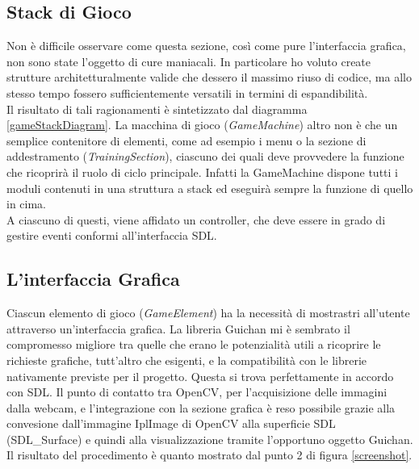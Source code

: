 \documentclass[a4paper,10pt, twocolumn]{article}
\begin{document}
  \subsection{Stack di Gioco}
  Non \`{e} difficile osservare come questa sezione, 
  cos\`{i} come pure l'interfaccia grafica, non sono state l'oggetto di cure maniacali.
  In particolare ho voluto create strutture architetturalmente valide che dessero il
  massimo riuso di codice, ma allo stesso tempo fossero sufficientemente versatili in termini
  di espandibilit\`{a}.\\
  Il risultato di tali ragionamenti \`{e} sintetizzato dal diagramma \ref{gameStackDiagram}.
  La macchina di gioco (\textit{GameMachine}) altro non \`{e} che un semplice contenitore di
  elementi, come ad esempio i menu o la sezione di addestramento (\textit{TrainingSection}), 
  ciascuno dei quali deve provvedere la funzione che ricoprir\`{a} il ruolo di 
  ciclo principale. Infatti la GameMachine dispone tutti i moduli contenuti in una 
  struttura a stack ed eseguir\`{a} sempre la funzione di quello in cima.\\
  A ciascuno di questi, viene 
  affidato un controller, che deve essere in grado di gestire eventi 
  conformi all'interfaccia SDL.
    
  \subsection{L'interfaccia Grafica}
  Ciascun elemento di gioco (\textit{GameElement}) ha la necessit\`{a} di mostrastri all'utente
  attraverso un'interfaccia grafica. La libreria Guichan \cite{guichan} mi \`{e}
  sembrato il compromesso migliore tra quelle che erano
  le potenzialit\`{a} utili a ricoprire le richieste grafiche, tutt'altro che esigenti,
  e la compatibilit\`{a} con le librerie nativamente previste per il progetto.
  Questa si trova perfettamente in accordo con SDL. Il punto di contatto tra 
  OpenCV, per l'acquisizione delle immagini dalla webcam, e l'integrazione con 
  la sezione grafica \`{e} reso possibile grazie alla convesione dall'immagine 
  IplImage di OpenCV alla superficie SDL (SDL\_Surface) e quindi alla visualizzazione
  tramite l'opportuno oggetto Guichan. Il risultato del procedimento \`{e}
  quanto mostrato dal punto 2 di figura \ref{screenshot}.
  
\end{document}
